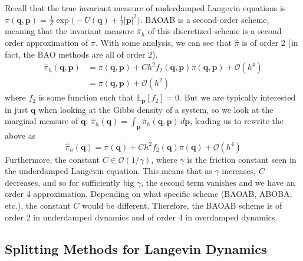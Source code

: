       Recall that the true invariant measure of underdamped Langevin equations is $\pi(\mathbf{q}, \mathbf{p}) = \frac{1}{Z} \exp \big( -U(\mathbf{q}) + \frac{1}{2} |\mathbf{p}|^2 \big)$. BAOAB is a second-order scheme, meaning that the invariant measure $\hat{\pi}_h$ of this discretized scheme is a second order approximation of $\pi$. With some analysis, we can see that $\hat{\pi}$ is of order 2 (in fact, the BAO methods are all of order 2). 
      \begin{align*}
        \hat{\pi}_h (\mathbf{q}, \mathbf{p}) & = \pi(\mathbf{q}, \mathbf{p}) + C h^2 f_2 (\mathbf{q}, \mathbf{p}) \pi(\mathbf{q}, \mathbf{p}) + \mathcal{O}(h^4) \\
        & = \pi(\mathbf{q}, \mathbf{p}) + \mathcal{O}(h^2)
      \end{align*}
      where $f_2$ is some function such that $\mathbb{E}_\mathbf{p} [f_2] = 0$. But we are typically interested in just $\mathbf{q}$ when looking at the Gibbs density of a system, so we look at the marginal measure of $\mathbf{q}$: $\hat{\pi}_h (\mathbf{q}) = \int_\mathbf{p} \hat{\pi}_h (\mathbf{q}, \mathbf{p})\, d\mathbf{p}$, leading us to rewrite the above as
      \begin{equation}
        \hat{\pi}_h (\mathbf{q}) = \pi(\mathbf{q}) + C h^2 f_2 (\mathbf{q}) \pi(\mathbf{q}) + \mathcal{O}(h^4)
      \end{equation}
      Furthermore, the constant $C \in \mathcal{O}(1/ \gamma)$, where $\gamma$ is the friction constant seen in the underdamped Langevin equation. This means that as $\gamma$ increases, $C$ decreases, and so for sufficiently big $\gamma$, the second term vanishes and we have an order 4 approximation. Depending on what specific scheme (BAOAB, ABOBA, etc.), the constant $C$ would be different. Therefore, the BAOAB scheme is of order 2 in underdamped dynamics and of order 4 in overdamped dynamics. 

  \subsection{Splitting Methods for Langevin Dynamics}

